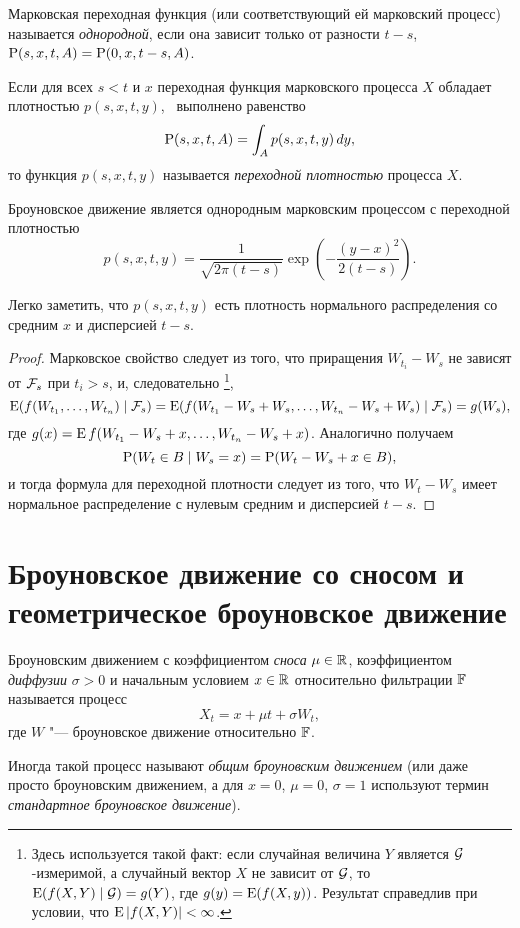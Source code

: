 \begin{definition}
Марковская переходная функция (или соответствующий ей марковский процесс) называется \emph{однородной}, если она зависит только от разности $t-s$, \te\ $\P(s,x,t,A) = \P(0,x,t-s,A)$.
\end{definition}

\begin{definition}
Если для всех $s<t$ и $x$ переходная функция марковского процесса $X$ обладает плотностью $p(s,x,t,y)$, \te\ выполнено равенство
\[
\P(s,x,t,A) = \int_A p(s,x,t,y)\,dy,
\]
то функция $p(s,x,t,y)$ называется \emph{переходной плотностью} процесса $X$.
\end{definition}

\begin{proposition}
Броуновское движение является однородным марковским процессом с переходной плотностью
\[
p(s,x,t,y) = \frac{1}{\sqrt{2\pi(t-s)}}\exp\left(-\frac{(y-x)^2}{2(t-s)}\right).
\] 
\end{proposition}
\begin{remark}
Легко заметить, что $p(s,x,t,y)$ есть плотность нормального распределения со средним $x$ и дисперсией $t-s$.
\end{remark}
\begin{proof}
Марковское свойство следует из того, что приращения $W_{t_i}-W_s$ не зависят от $\F_s$ при $t_i>s$, и, следовательно%
\footnote{Здесь используется такой факт: если случайная величина $Y$ является $\G$-измеримой, а случайный вектор $X$ не зависит от $\G$, то $\E(f(X,Y) \mid \G) = g(Y)$, где $g(y) = \E(f(X,y))$.
Результат справедлив при условии, что $\E| f(X,Y)| < \infty$.}, 
\[
\E( f(W_{t_1}, \ldots, W_{t_n}) \mid \F_s)
= \E( f(W_{t_1} - W_s + W_s, \ldots, W_{t_n} - W_s + W_s) \mid \F_s)
= g(W_s),
\]
где $g(x) = \E f(W_{t_1} - W_s + x, \ldots, W_{t_n} - W_s + x)$.
Аналогично получаем
\[
\P(W_t \in B \mid W_s = x) = \P( W_t - W_s + x \in B),
\]
и тогда формула для переходной плотности следует из того, что $W_t - W_s$ имеет нормальное распределение с нулевым средним и дисперсией $t-s$.
\end{proof}


\section{Броуновское движение со сносом и геометрическое броуновское движение}

\begin{definition}
Броуновским движением с коэффициентом \emph{сноса} $\mu\in\R$, коэффициентом \emph{диффузии} $\sigma>0$ и начальным условием $x\in\R$ относительно фильтрации $\FF$ называется процесс
\[
X_t = x + \mu t + \sigma W_t,
\]
где $W$ "--- броуновское движение относительно $\FF$.

Иногда такой процесс называют \emph{общим броуновским движением} (или даже просто броуновским движением, а для $x=0$, $\mu=0$, $\sigma=1$ используют термин \emph{стандартное броуновское движение}).
\end{definition}

